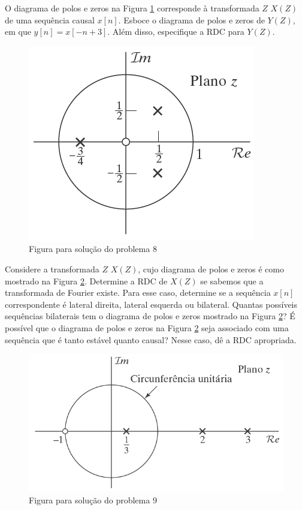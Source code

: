\documentclass[12pt,a4paper]{article}
\begin{document}
\answer

\problem O diagrama de polos e zeros na Figura \ref{fig8} corresponde
à transformada $Z$ $X(Z)$ de uma sequência causal $x[n]$. Esboce
o diagrama de polos e zeros de $Y(Z)$, em que $y[n] = x[-n + 3]$. Além disso, especifique a RDC para $Y(Z)$.
\begin{figure}[h!]
    \centering
    \includegraphics[scale=0.6]{Fig/feg8.png}
    \caption{Figura para solução do problema 8}
    \label{fig8}
\end{figure}

\answer

\problem Considere a transformada $Z$ $X(Z)$, cujo diagrama de polos
e zeros é como mostrado na Figura \ref{fig9}. 
\subproblem Determine a RDC de $X(Z)$ se sabemos que a transformada
de Fourier existe. Para esse caso, determine se a sequência $x[n]$ correspondente é lateral direita, lateral esquerda ou bilateral.
\subproblem Quantas possíveis sequências bilaterais tem o diagrama de polos e zeros mostrado na Figura \ref{fig9}?
\subproblem É possível que o diagrama de polos e zeros na Figura \ref{fig9} seja associado com uma sequência que é tanto estável quanto causal? Nesse caso, dê a RDC apropriada.

\begin{figure}[h!]
    \centering
    \includegraphics[scale=0.6]{Fig/fig9.png}
    \caption{Figura para solução do problema 9}
    \label{fig9}
\end{figure}
\end{document}
